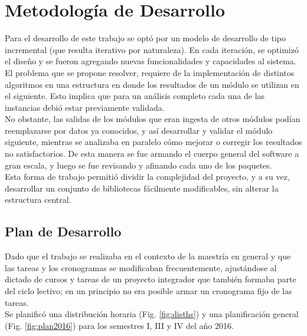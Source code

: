 \chapter{Metodología de Desarrollo}
\label{chap:metodologia}
 
Para el desarrollo de este trabajo se opt\'o por un modelo de desarrollo de tipo incremental (que resulta iterativo por naturaleza).
En cada iteraci\'on, se optimiz\'o el dise\~no y se fueron agregando nuevas funcionalidades y capacidades al sistema.\\

El problema que se propone resolver, requiere de la implementaci\'on de distintos algoritmos en una estructura en donde los resultados de un m\'odulo se utilizan en el siguiente. Esto implica que para un an\'alisis completo cada una de las instancias debi\'o estar previamente validada. \\

No obstante, las salidas de los m\'odulos que eran ingesta de otros m\'odulos pod\'ian reemplazarse por datos ya conocidos, y as\'i desarrollar y validar el m\'odulo siguiente, mientras se analizaba en paralelo c\'omo mejorar o corregir los resultados no satisfactorios. De esta manera se fue armando el cuerpo general del software a gran escala, y luego se fue revisando y afinando cada uno de los paquetes.\\

Esta forma de trabajo permiti\'o dividir la complejidad del proyecto, y a su vez, desarrollar un conjunto de bibliotecas f\'acilmente modificables, sin alterar la estructura central.



\section{Plan de Desarrollo}

Dado que el trabajo se realizaba en el contexto de la maestr\'ia en general y que las tareas y los cronogramas se modificaban frecuentemente, ajust\'andose al dictado de cursos y tareas de un proyecto integrador que tambi\'en formaba parte del ciclo lectivo; en un principio no era posible armar un cronograma fijo de las tareas.\\

Se planific\'o una distribuci\'on horaria (Fig. \ref{fig:disths}) y una planificaci\'on general (Fig. \ref{fig:plan2016}) para los semestres I, III y IV del año 2016.

